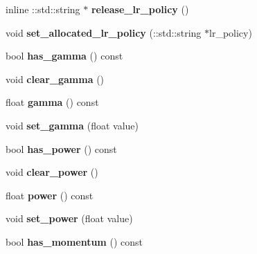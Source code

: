 \begin{DoxyCompactItemize}
inline \+::std\+::string $\ast$ {\bfseries release\+\_\+lr\+\_\+policy} ()
\item 
\mbox{\label{classcaffe_1_1_solver_parameter_a5b899b9f7a3514d6c4aebbb678e36d8d}} 
void {\bfseries set\+\_\+allocated\+\_\+lr\+\_\+policy} (\+::std\+::string $\ast$lr\+\_\+policy)
\item 
\mbox{\label{classcaffe_1_1_solver_parameter_a9b680ec06735bc6157f47e68ad167de1}} 
bool {\bfseries has\+\_\+gamma} () const
\item 
\mbox{\label{classcaffe_1_1_solver_parameter_ae814b3413a06cd11f11e536688a528aa}} 
void {\bfseries clear\+\_\+gamma} ()
\item 
\mbox{\label{classcaffe_1_1_solver_parameter_adb65644979e3b88ba101294ec9278022}} 
float {\bfseries gamma} () const
\item 
\mbox{\label{classcaffe_1_1_solver_parameter_ab33095f7869f8ab61ffe10707876d8ee}} 
void {\bfseries set\+\_\+gamma} (float value)
\item 
\mbox{\label{classcaffe_1_1_solver_parameter_a149a24fbb73ac7e602f527546c9711a0}} 
bool {\bfseries has\+\_\+power} () const
\item 
\mbox{\label{classcaffe_1_1_solver_parameter_a06f32cec261fe2504a579ef78d97fae1}} 
void {\bfseries clear\+\_\+power} ()
\item 
\mbox{\label{classcaffe_1_1_solver_parameter_a6872b784786c951b67c0f9ffa21a8f9d}} 
float {\bfseries power} () const
\item 
\mbox{\label{classcaffe_1_1_solver_parameter_a973440f69d1b5fa59d578756b9c789d1}} 
void {\bfseries set\+\_\+power} (float value)
\item 
\mbox{\label{classcaffe_1_1_solver_parameter_a7b517b2d8887fd632b845114e34aa16f}} 
bool {\bfseries has\+\_\+momentum} () const

\end{DoxyCompactItemize}
